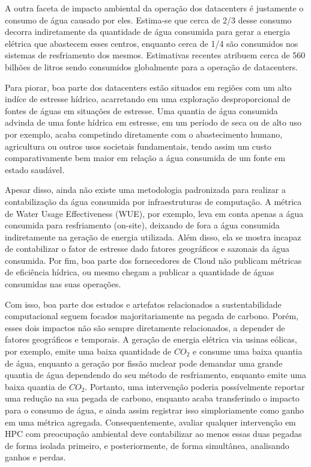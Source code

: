 A outra faceta de impacto ambiental da operação dos datacenters é justamente o 
consumo de água causado por eles. Estima-se que cerca de 2/3 desse consumo decorra
indiretamente da quantidade de água consumida para gerar a energia elétrica que 
abastecem esses centros, enquanto cerca de 1/4 são consumidos nos sistemas de resfriamento
dos mesmos. Estimativas recentes atribuem cerca de 560 bilhões de litros sendo consumidos
globalmente para a operação de datacenters. 

Para piorar, boa parte dos datacenters estão situados 
em regiões com um alto indíce de estresse hídrico, acarretando em uma exploração desproporcional 
de fontes de águas em situações de estresse. Uma quantia de água consumida advinda de uma fonte
hídrica em estresse, em um período de seca ou de alto uso por exemplo, acaba competindo diretamente
com o abastecimento humano, agricultura ou outros usos societais fundamentais, tendo assim um
custo comparativamente bem maior em relação a água consumida de um fonte em estado saudável.

Apesar disso, ainda não existe uma metodologia padronizada para realizar a contabilização
da água consumida por infraestruturas de computação. A métrica de Water Usage Effectiveness (WUE),
por exemplo, leva em conta apenas a água consumida para resfriamento (on-site), deixando de 
fora a água consumida indiretamente na geração de energia utilizada. Além disso, ela se mostra incapaz
de contabilizar o fator de estresse dado fatores geográficos e sazonais da água consumida. Por fim,
boa parte dos fornecedores de Cloud não publicam métricas de eficiência hídrica, ou mesmo chegam a
publicar a quantidade de águas consumidas nas suas operações.

Com isso, boa parte dos estudos e artefatos relacionados a sustentabilidade computacional
seguem focados majoritariamente na pegada de carbono. Porém, esses dois impactos não são
sempre diretamente relacionados, a depender de fatores geográficos e temporais. A geração de energia elétrica
via usinas eólicas, por exemplo, emite uma baixa quantidade de $CO_{2}$ e consume uma baixa quantia de água,
enquanto a geração por fissão nuclear pode demandar uma grande quantia de água dependendo 
do seu método de resfriamento, enquanto emite uma baixa quantia de $CO_{2}$. Portanto, uma intervenção
poderia possívelmente reportar uma redução na sua pegada de carbono, enquanto acaba transferindo o impacto
para o consumo de água, e ainda assim registrar isso simploriamente como ganho em uma métrica agregada.
Consequentemente, avaliar qualquer intervenção em HPC com preocupação ambiental deve contabilizar ao menos
essas duas pegadas de forma isolada primeiro, e posteriormente, de forma simultânea, analisando ganhos e perdas.

